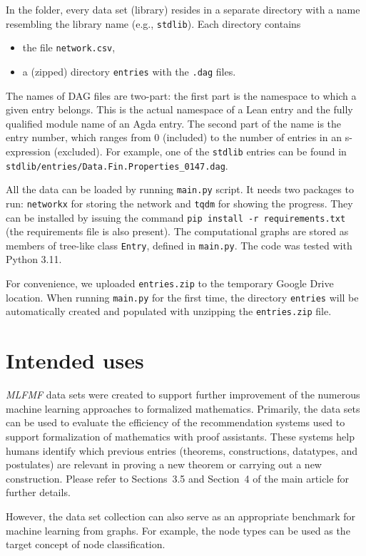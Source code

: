 \documentclass{article}
\begin{document}
In the folder, every data set (library) resides in a separate directory with a name resembling the library name (e.g., \texttt{stdlib}). Each directory contains
\begin{itemize}
    \item the file \texttt{network.csv},
    \item a (zipped) directory \texttt{entries} with the \texttt{.dag} files.
\end{itemize}
The names of DAG files are two-part: the first part is the namespace to which a given entry belongs. This is the actual namespace of a Lean entry and the fully qualified module name of an Agda entry. The second part of the name is the entry number, which ranges from $0$ (included) to the number of entries in an s-expression (excluded). For example, one of the \texttt{stdlib} entries can be found in \texttt{stdlib/entries/Data.Fin.Properties\_0147.dag}.

All the data can be loaded by running \texttt{main.py} script. It needs two packages to run: \texttt{networkx} for storing the network and \texttt{tqdm} for showing the progress. They can be installed by issuing the command \texttt{pip install -r requirements.txt} (the requirements file is also present). The computational graphs are stored as members of tree-like class \texttt{Entry}, defined in \texttt{main.py}. The code was tested with Python 3.11. 

For convenience, we uploaded \texttt{entries.zip} to the temporary Google Drive location. When running \texttt{main.py} for the first time, the directory \texttt{entries} will be automatically created and populated with unzipping the \texttt{entries.zip} file.

\section{Intended uses}
\emph{MLFMF} data sets were created to support further improvement of the numerous machine learning approaches to formalized mathematics. Primarily, the data sets can be used to evaluate the efficiency of the recommendation systems used to support formalization of mathematics with proof assistants. These systems help humans identify which previous entries (theorems, constructions, datatypes, and postulates) are relevant in proving a new theorem or carrying out a new construction. Please refer to Sections~3.5 and Section~4 of the main article for further details.

However, the data set collection can also serve as an appropriate benchmark for machine learning from graphs. For example, the node types can be used as the target concept of node classification.
\end{document}
